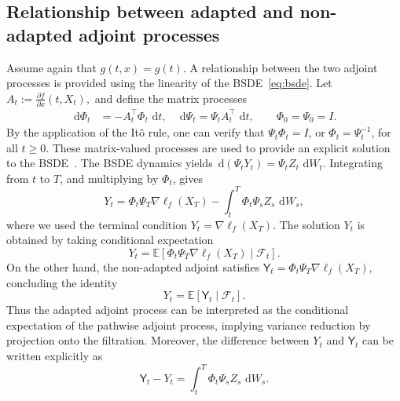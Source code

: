 \documentclass[letterpaper, 10 pt, conference]{ieeeconf}  %
\def\Expect{{\mathbb E}}
\newtheorem{remark}{Remark}
\newcommand{\ud}{\,\mathrm{d}}
\newcommand{\Yn}{\mathsf Y}
\begin{document}


\subsection{Relationship between adapted and non-adapted adjoint processes}

Assume again that $g(t,x)=g(t)$. A relationship between the two adjoint processes is provided using the linearity of the BSDE~\eqref{eq:bsde}.  Let
$
A_t
:=
\frac{\partial f}{\partial x}(t,X_t), 
$
and define the matrix processes
\begin{align*}
\ud \Phi_t &= -A_t^\top \Phi_t\,\ud t,
\quad 
\ud \Psi_t = \Psi_t A_t^\top\,\ud t,
\qquad
\Phi_0=\Psi_0 = I .
\end{align*}
By the application of the It\^o rule, 
one can verify that
$
 \Psi_t \Phi_t = I
$, or $\Phi_t = \Psi_t^{-1}$, for all $t\geq 0$. These matrix-valued processes are used to provide an explicit solution to the BSDE~\cite[Sec. 7.2]{yong1999stochastic}. 
The BSDE dynamics yields 
$
\ud(\Psi_t Y_t) = \Psi_t Z_t\,\ud W_t 
$. 
Integrating from $t$ to $T$, and multiplying by $\Phi_t$, gives \[
Y_t
=
\Phi_t\Psi_T \nabla \ell_f(X_T)
-
\int_t^T \Phi_t\Psi_s Z_s\,\ud W_s, 
\]
where we used the terminal condition $Y_t = \nabla \ell_f(X_T)$. 
The solution $Y_t$ is obtained by taking conditional expectation
\[
Y_t
=
\mathbb E
\left[\Phi_t 
\Psi_T \nabla \ell_f(X_T)
\mid
\mathcal F_t
\right].
\]
On the other hand, the non-adapted adjoint satisfies
$
\Yn_t
=
\Phi_t \Psi_T
\nabla \ell_f(X_T)
$, 
concluding the identity 
\[
Y_t
=
\mathbb E[\Yn_t\mid\mathcal F_t].
\]
Thus the adapted adjoint process can be interpreted as the conditional expectation of the pathwise adjoint process, implying variance reduction  by projection onto the filtration.
Moreover, the difference between $Y_t$ and $\Yn_t$ can be written explicitly as 
\[
\Yn_t - Y_t
=
\int_t^T
\Phi_t\Psi_s Z_s\,\ud W_s. 
\]
\end{document}
